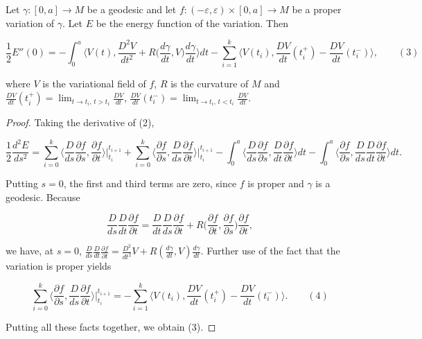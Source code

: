 \begin{proposition}
  \label{prop:dc-ch9-2-8}
  Let $\gamma:[0,a]\to M$ be a geodesic and let
  $f:(-\varepsilon,\varepsilon)\times[0,a]\to M$ be a proper variation of $\gamma$. Let $E$
  be the energy function of the variation. Then

  $$
  \frac{1}{2}E''(0)=-\int_0^a\Big\langle V(t),\frac{D^2 V}{dt^2}+R\Big(\frac{d\gamma}{dt},V\Big)\frac{d\gamma}{dt}\Big\rangle dt-\sum_{i=1}^k\Big\langle V(t_i),\frac{DV}{dt}(t_i^+)-\frac{DV}{dt}(t_i^-)\Big\rangle,\qquad(3)
  $$

  where $V$ is the variational field of $f$, $R$ is the curvature of $M$ and
  $\frac{DV}{dt}(t_i^+)=\lim_{t\to t_i,\,t>t_i}\frac{DV}{dt}$,
  $\frac{DV}{dt}(t_i^-)=\lim_{t\to t_i,\,t<t_i}\frac{DV}{dt}$.
\end{proposition}
\begin{proof}
  \sketch
  Taking the derivative of (2),

  $$
  \frac{1}{2}\frac{d^2 E}{ds^2}=\sum_{i=0}^k\Big\langle\frac{D}{ds}\frac{\partial f}{\partial s},\frac{\partial f}{\partial t}\Big\rangle\Big|_{t_i}^{t_{i+1}}+\sum_{i=0}^k\Big\langle\frac{\partial f}{\partial s},\frac{D}{ds}\frac{\partial f}{\partial t}\Big\rangle\Big|_{t_i}^{t_{i+1}}-\int_0^a\Big\langle\frac{D}{ds}\frac{\partial f}{\partial s},\frac{D}{dt}\frac{\partial f}{\partial t}\Big\rangle dt-\int_0^a\Big\langle\frac{\partial f}{\partial s},\frac{D}{ds}\frac{D}{dt}\frac{\partial f}{\partial t}\Big\rangle dt.
  $$

  Putting $s=0$, the first and third terms are zero, since $f$ is proper and
  $\gamma$ is a geodesic. Because

  $$
  \frac{D}{ds}\frac{D}{dt}\frac{\partial f}{\partial t}=\frac{D}{dt}\frac{D}{ds}\frac{\partial f}{\partial t}+R\Big(\frac{\partial f}{\partial t},\frac{\partial f}{\partial s}\Big)\frac{\partial f}{\partial t},
  $$

  we have, at $s=0$,
  $\frac{D}{ds}\frac{D}{dt}\frac{\partial f}{\partial t}=\frac{D^2}{dt^2}V+R(\frac{d\gamma}{dt},V)\frac{d\gamma}{dt}$.
  Further use of the fact that the variation is proper yields

  $$
  \sum_{i=0}^k\Big\langle\frac{\partial f}{\partial s},\frac{D}{ds}\frac{\partial f}{\partial t}\Big\rangle\Big|_{t_i}^{t_{i+1}}=-\sum_{i=1}^k\Big\langle V(t_i),\frac{DV}{dt}(t_i^+)-\frac{DV}{dt}(t_i^-)\Big\rangle.\qquad(4)
  $$

  Putting all these facts together, we obtain (3).
\end{proof}
